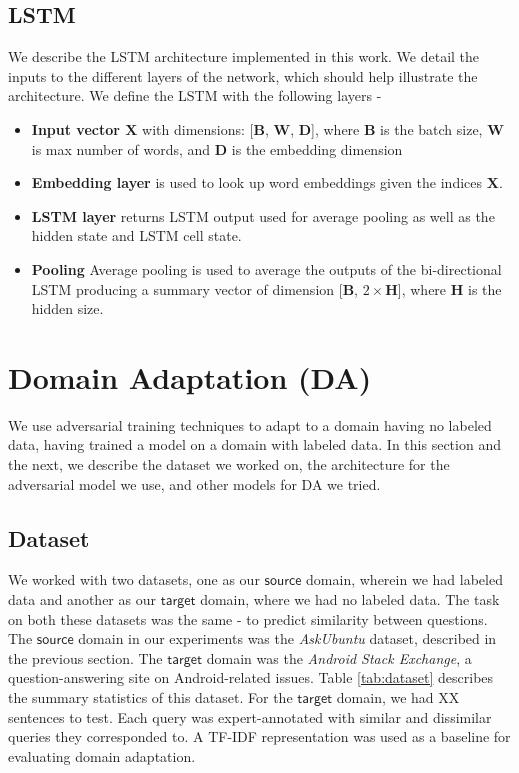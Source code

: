 \documentclass{sigkddExp}
\begin{document}
\subsection{LSTM}
{\color{red} 
We describe the LSTM architecture implemented in this work. We detail the inputs to the different layers of the network, which should help illustrate the architecture.
We define the LSTM with the following layers -
\begin{itemize}[topsep=0pt,itemsep=-1ex,partopsep=1ex,parsep=1ex]
\item \textbf{Input vector $\mathbf{X}$} with dimensions: [$\mathbf{B}$, $\mathbf{W}$, $\mathbf{D}$], where $\mathbf{B}$ is the batch size, $\mathbf{W}$ is max number of words, and $\mathbf{D}$ is the embedding dimension
\item \textbf{Embedding layer} is used to look up word embeddings given  the indices $\mathbf{X}$.
\item \textbf{LSTM layer} returns LSTM output used for average pooling as well as the hidden state and LSTM cell state.
\item \textbf{Pooling} Average pooling is used to average the outputs of the bi-directional LSTM producing a summary vector of dimension [$\mathbf{B}$, $2\times \mathbf{H}$], where $\mathbf{H}$ is the hidden size. 
\end{itemize}
}
\section{Domain Adaptation (DA)}
\label{domain_adapt}
 We use adversarial training techniques \cite{ganin2015unsupervised} to adapt to a domain having no labeled data, having trained a model on a domain with labeled data. In this section and the next, we describe the dataset we worked on, the architecture for the adversarial model we use, and other models for DA we tried.


\subsection{Dataset}
We worked with two datasets, one as our $\mathsf{source}$ domain, wherein we had labeled data and another as our $\mathsf{target}$ domain, where we had no labeled data. The task on both these datasets was the same - to predict similarity between questions. The $\mathsf{source}$ domain in our experiments was the \textit{AskUbuntu} dataset, described in the previous section. The $\mathsf{target}$ domain was the \textit{Android Stack Exchange}, a question-answering site on Android-related issues. Table \ref{tab:dataset} describes the summary statistics of this dataset. For the $\mathsf{target}$ domain, we had {\color{red} XX} sentences to test. Each query was expert-annotated with similar and dissimilar queries they corresponded to. A TF-IDF representation was used as a baseline for evaluating domain adaptation.
\end{document}
